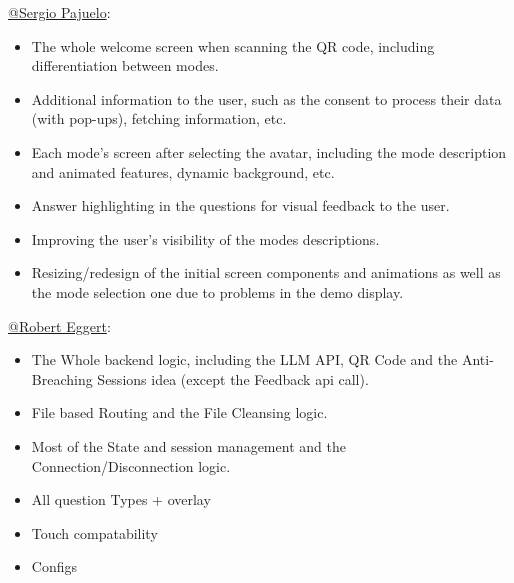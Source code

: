 \href{https://github.com/sergioPajuelo}{@Sergio Pajuelo}:
\begin{itemize}
    \item The whole welcome screen when scanning the QR code, including differentiation between modes.
    \item Additional information to the user, such as the consent to process their data (with pop-ups), fetching information, etc.
    \item Each mode's screen after selecting the avatar, including the mode description and animated features, dynamic background, etc.
    \item Answer highlighting in the questions for visual feedback to the user.
    \item Improving the user's visibility of the modes descriptions.
    \item Resizing/redesign of the initial screen components and animations as well as the mode selection one due to problems in the demo display.
\end{itemize}

\href{https://github.com/RobertEggert}{@Robert Eggert}: 
\begin{itemize}
    \item The Whole backend logic, including the LLM API, QR Code and the Anti-Breaching Sessions idea (except the Feedback api call).
    \item File based Routing and the File Cleansing logic.
    \item Most of the State and session management and the Connection/Disconnection logic.
    \item All question Types + overlay
    \item Touch compatability
    \item Configs
\end{itemize}